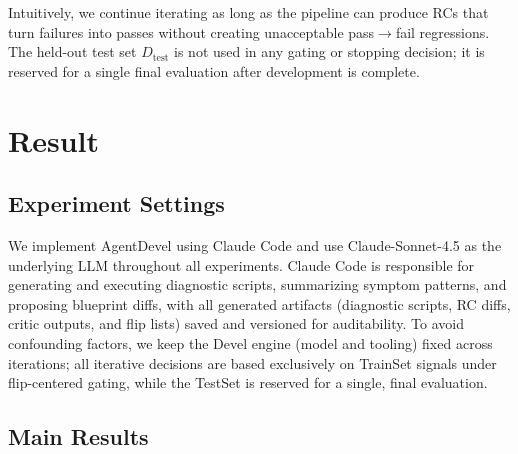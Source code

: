 \documentclass[11pt]{article}
\begin{document}
Intuitively, we continue iterating as long as the pipeline can produce RCs that turn failures into passes without creating unacceptable pass$\rightarrow$fail regressions. The held-out test set $D_{\text{test}}$ is not used in any gating or stopping decision; it is reserved for a single final evaluation after development is complete.

\section{Result}
\subsection{Experiment Settings}

We implement AgentDevel using Claude Code and use Claude-Sonnet-4.5 as the underlying LLM throughout all experiments. Claude Code is responsible for generating and executing diagnostic scripts, summarizing symptom patterns, and proposing blueprint diffs, with all generated artifacts (diagnostic scripts, RC diffs, critic outputs, and flip lists) saved and versioned for auditability. To avoid confounding factors, we keep the Devel engine (model and tooling) fixed across iterations; all iterative decisions are based exclusively on TrainSet signals under flip-centered gating, while the TestSet is reserved for a single, final evaluation.

\subsection{Main Results}
\end{document}
